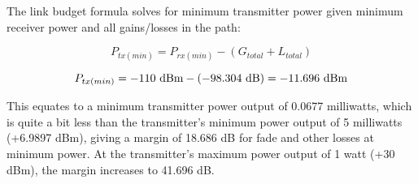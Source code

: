 The link budget formula solves for minimum transmitter power given minimum receiver power and all gains/losses in the path:

$$P_{tx(min)} = P_{rx(min)} - (G_{total} + L_{total})$$

$$P_{tx(min)} = -110 \hbox{ dBm} - (-98.304 \hbox{ dB}) = -11.696 \hbox{ dBm}$$

This equates to a minimum transmitter power output of 0.0677 milliwatts, which is quite a bit less than the transmitter's minimum power output of 5 milliwatts (+6.9897 dBm), giving a margin of 18.686 dB for fade and other losses at minimum power.  At the transmitter's maximum power output of 1 watt (+30 dBm), the margin increases to 41.696 dB.




